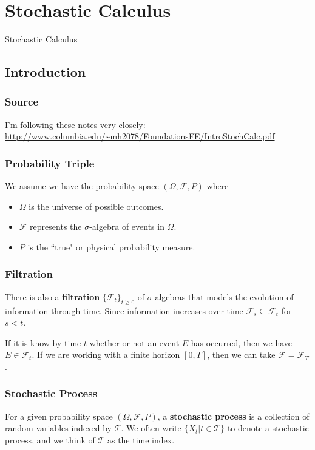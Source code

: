 \documentclass{beamer}
\begin{document}
\section{Stochastic Calculus} 

\begin{frame}
\begin{center}
\Huge Stochastic Calculus
\end{center}
\end{frame}

\subsection{Introduction} 

\begin{frame}
\frametitle{Source} 
I'm following these notes very closely: \url{http://www.columbia.edu/~mh2078/FoundationsFE/IntroStochCalc.pdf}
\end{frame}

\begin{frame}
\frametitle{Probability Triple}
We assume we have the probability space $(\Omega, \mathcal{F}, P)$ where
\begin{itemize}
\item $\Omega$ is the universe of possible outcomes.
\item $\mathcal{F}$ represents the $\sigma$-algebra of events in $\Omega$.
\item $P$ is the ``true" or physical probability measure.
\end{itemize}
\end{frame}

\begin{frame}
\frametitle{Filtration}
There is also a {\bf filtration} $\{\mathcal{F}_t\}_{t\geq 0}$ of $\sigma$-algebras that models the evolution of information through time. Since information increases over time $\mathcal{F}_s \subseteq \mathcal{F}_t$ for $s < t$.

If it is know by time $t$ whether or not an event $E$ has occurred, then we have $E\in\mathcal{F}_t$. If we are working with a finite horizon $[0, T]$, then we can take $\mathcal{F} = \mathcal{F}_T$.
\end{frame}

\begin{frame}
\frametitle{Stochastic Process}

\begin{Definition}
For a given probability space $(\Omega, \mathcal{F}, P)$, a {\bf stochastic process} is a collection of random variables indexed by $\mathcal{T}$. We often write $\{X_t | t \in\mathcal{T}\}$ to denote a stochastic process, and we think of $\mathcal{T}$ as the time index.
\end{Definition}
\end{frame}
\end{document}

